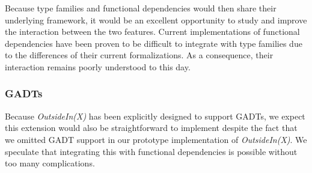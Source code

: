Because type families and functional dependencies would then share their
underlying framework, it would be an excellent opportunity to study and
improve the interaction between the two features. Current implementations of
functional dependencies have been proven to be difficult to integrate with type
families due to the differences of their current formalizations. As a consequence,
their interaction remains poorly understood to this day.

%
%
%

\subsubsection{GADTs}

Because \textit{OutsideIn(X)} has been explicitly designed to support GADTs, we expect
this extension would also be straightforward to implement despite the fact that
we omitted GADT support in our prototype implementation of \textit{OutsideIn(X)}. We
speculate that integrating this with functional dependencies is possible
without too many complications.
